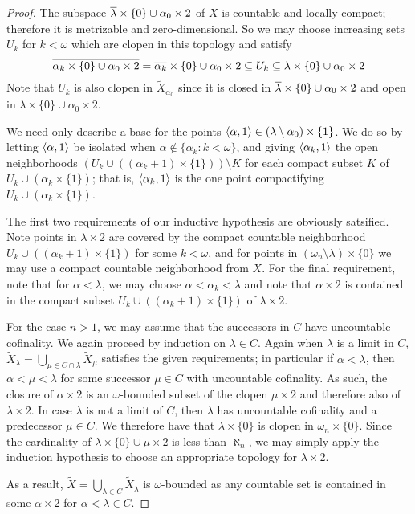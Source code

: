 \documentclass{amsart}
\theoremstyle{plain}
\theoremstyle{definition}
\theoremstyle{remark}
\theoremstyle{plain}
\theoremstyle{definition}
\theoremstyle{remark}
\begin{document}
\begin{proof}
    The subspace \(\overline{\lambda}\times\{0\}\cup\alpha_0\times2\) of \(X\)
    is countable and locally compact; therefore it is
    metrizable and zero-dimensional.
    So we may choose increasing sets \(U_k\) for \(k<\omega\) which are
    clopen in this topology and satisfy
    \[
      \overline{\alpha_k\times\{0\}\cup\alpha_0\times2}
        =
      \overline{\alpha_k}\times\{0\}\cup\alpha_0\times2
        \subseteq
      U_k
        \subseteq
      \lambda\times\{0\}\cup\alpha_0\times 2
    \]
    Note that \(U_k\) is also clopen in \(\tilde X_{\alpha_0}\) since it is
    closed in \(\overline{\lambda}\times\{0\}\cup\alpha_0\times2\) and open in
    \(\lambda\times\{0\}\cup\alpha_0\times 2\).

    We need only describe a base for the points
    \(\langle\alpha,1\rangle\in(\lambda\setminus\alpha_0)\times\{1\}\).
    We do so by letting
    \(\langle\alpha,1\rangle\) be isolated when \(\alpha\not\in\{\alpha_k:k<\omega\}\),
    and giving \(\langle\alpha_k,1\rangle\) the open neighborhoods
    \((U_k\cup((\alpha_k+1)\times\{1\}))\setminus K\) for each compact
    subset \(K\) of \(U_k\cup(\alpha_k\times\{1\})\); that is,
    \(\langle\alpha_k,1\rangle\) is the one point compactifying
    \(U_k\cup(\alpha_k\times\{1\})\).

    The first two requirements of our inductive hypothesis are obviously
    satsified. Note points in \(\lambda\times 2\) are covered by
    the compact countable neighborhood \(U_k\cup((\alpha_k+1)\times\{1\})\)
    for some \(k<\omega\), and for points in
    \((\omega_n\setminus\lambda)\times\{0\}\) we may use a compact
    countable neighborhood from \(X\).
    For the final requirement, note that for \(\alpha<\lambda\), we may
    choose \(\alpha<\alpha_k<\lambda\) and note that
    \(\alpha\times 2\) is contained in the compact
    subset \(U_k\cup((\alpha_k+1)\times\{1\})\) of \(\lambda\times2\).

    For the case \(n>1\), we may assume that the successors in \(C\)
    have uncountable cofinality.
    We again proceed by induction on \(\lambda\in C\).  Again when
    \(\lambda\) is a limit in \(C\),
    \(
      \tilde X_\lambda
        =
      \bigcup_{\mu\in C\cap\lambda}\tilde X_\mu
    \)
    satisfies the given
    requirements; in particular if \(\alpha<\lambda\), then
    \(\alpha<\mu<\lambda\) for some successor \(\mu\in C\) with uncountable
    cofinality. As such, the closure of \(\alpha\times2\) is
    an \(\omega\)-bounded subset of the clopen \(\mu\times 2\) and
    therefore also of \(\lambda\times 2\).
    In case \(\lambda\) is not a limit of \(C\), then \(\lambda\)
    has uncountable cofinality and a predecessor \(\mu\in C\).
    We therefore have that \(\lambda\times\{0\}\) is clopen
    in \(\omega_n\times \{0\}\). Since the cardinality of
    \(\lambda\times \{0\} \cup \mu\times 2\) is less than \(\aleph_n\),
    we may simply apply the induction hypothesis
    to choose an appropriate topology for \(\lambda\times 2\).

    As a result, \(\tilde X=\bigcup_{\lambda\in C}\tilde X_\lambda\)
    is
    \(\omega\)-bounded as any countable set is contained in some
    \(\alpha\times 2\) for \(\alpha<\lambda\in C\).
  \end{proof}
\end{document}

